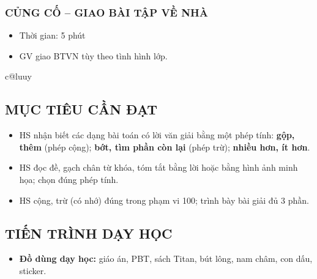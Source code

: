 \documentclass[../main.tex]{subfiles}
\begin{document}
\subsubsection{CỦNG CỐ -- GIAO BÀI TẬP VỀ NHÀ}
\begin{hd}
    \begin{itemize}
        \item Thời gian: 5 phút
        \item GV giao BTVN tùy theo tình hình lớp.
    \end{itemize}
\end{hd}

\newpage
\setcounter{subsection}{0}
\setcounter{vd}{0}%
\ifcsname c@luuy\endcsname\setcounter{luuy}{0}\fi%
\begin{center}
\end{center}

\subsection{MỤC TIÊU CẦN ĐẠT}
\begin{itemize}
    \item HS nhận biết các dạng bài toán có lời văn giải bằng một phép tính: \textbf{gộp, thêm} (phép cộng); \textbf{bớt, tìm phần còn lại} (phép trừ); \textbf{nhiều hơn, ít hơn}.
    \item HS đọc đề, gạch chân từ khóa, tóm tắt bằng lời hoặc bằng hình ảnh minh họa; chọn đúng phép tính.
    \item HS cộng, trừ (có nhớ) đúng trong phạm vi 100; trình bày bài giải đủ 3 phần.
\end{itemize}

\subsection{TIẾN TRÌNH DẠY HỌC}
\begin{itemize}
    \item \textbf{Đồ dùng dạy học:} giáo án, PBT, sách Titan, bút lông, nam châm, con dấu, sticker.
\end{itemize}
\vspace{2pt}
\end{document}
